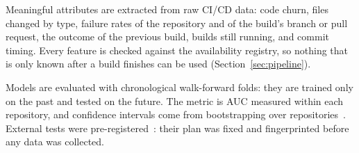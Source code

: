 Meaningful attributes are extracted from raw CI/CD data: code churn, files changed by type, failure rates of the repository and of the build's branch or pull request, the outcome of the previous build, builds still running, and commit timing. Every feature is checked against the availability registry, so nothing that is only known after a build finishes can be used (Section~\ref{sec:pipeline}).

Models are evaluated with chronological walk-forward folds: they are trained only on the past and tested on the future. The metric is AUC measured within each repository, and confidence intervals come from bootstrapping over repositories~\cite{efron1993introduction}. External tests were pre-registered~\cite{nosek2018preregistration}: their plan was fixed and fingerprinted before any data was collected.

